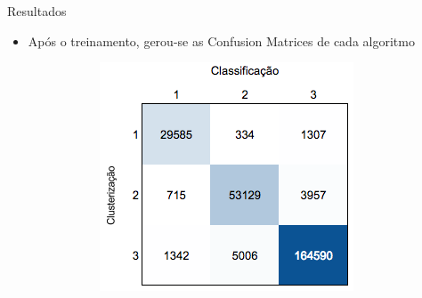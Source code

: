 \documentclass[final,hyperref={pdfpagelabels=false, brazil}]{beamer}
\let\olditem=\item%
\renewcommand{\item}{\olditem \justifying}%
\begin{document}
\begin{frame}[t]
\begin{columns}[t]
\begin{column}{.465\textwidth}
\begin{block}{Resultados}
\begin{itemize}



\begin{itemize}

\item Após o treinamento, gerou-se as Confusion Matrices de cada algoritmo

\begin{figure}[t!]
    \centering
        \caption{Confusion Matrices}
    \begin{subfigure}[t]{0.42\textwidth}
        \centering
\includegraphics[width=1\linewidth]{CM-RL-abs.png}


\end{subfigure}
\end{figure}
\end{itemize}
\end{itemize}
\end{block}
\end{column}
\end{columns}
\end{frame}
\end{document}
